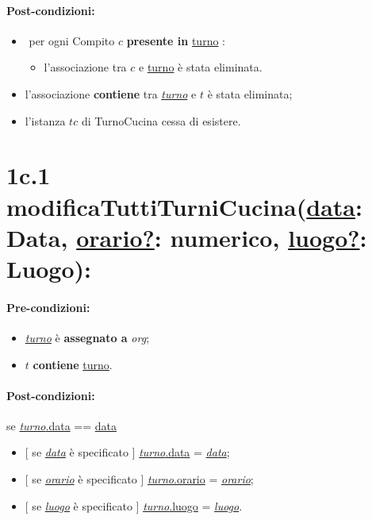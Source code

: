 \paragraph{Post-condizioni:}

\begin{itemize}
   \item \textlangle $ $ per ogni Compito $c$ \textbf{presente in} \underline{turno} \textrangle:
    \begin{itemize}
        \item l'associazione tra $c$ e \underline{turno} è stata eliminata.
    \end{itemize}
    \item l'associazione \textbf{contiene} tra \underline{\textit{turno}} e $t$ è stata eliminata;
    \item l'istanza $tc$ di TurnoCucina cessa di esistere.
\end{itemize}

\section*{1c.1 modificaTuttiTurniCucina(\underline{data}: Data, \underline{orario?}: numerico, \underline{luogo?}: Luogo):}

\paragraph{Pre-condizioni:}

\begin{itemize}
 \item \underline{\textit{turno}} è \textbf{assegnato a} {\textit{org}};
 \item $t$ \textbf{contiene} \underline{turno}.
\end{itemize}

\paragraph{Post-condizioni:} se \underline{\textit{turno}.data} == \underline{data}

 \begin{itemize}
     \item $[$ se \underline{\textit{data}} è specificato $]$ \underline{\textit{turno}.data} = \underline{\textit{data}};

    \item $[$ se \underline{\textit{orario}} è specificato $]$ \underline{\textit{turno}.orario} = \underline{\textit{orario}};

    \item $[$ se \underline{\textit{luogo}} è specificato $]$ \underline{\textit{turno}.luogo} = \underline{\textit{luogo}}.

\end{itemize}

